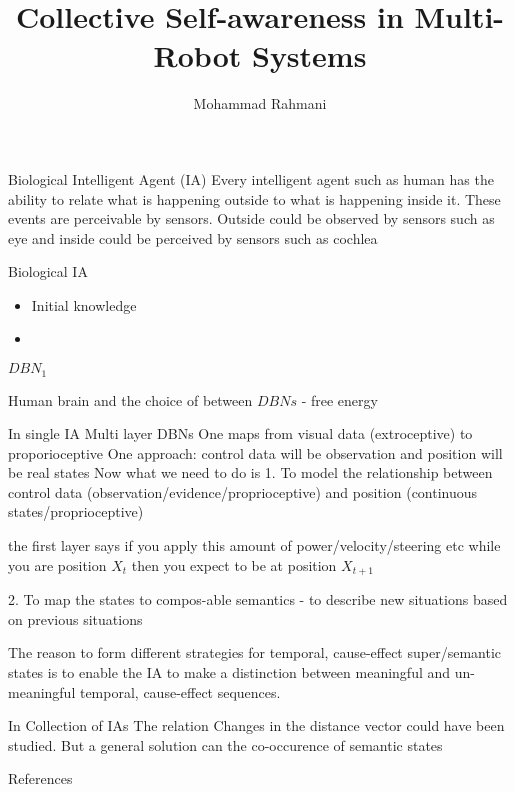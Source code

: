 \documentclass[unknownkeysallowed]{beamer}
\title{Collective Self-awareness in Multi-Robot Systems}
\author{Mohammad Rahmani}
\institute{DECIDE Doctoral School}
\begin{document}
\begin{frame}
	\maketitle
\end{frame}


\begin{frame}{Biological Intelligent Agent (IA)}
	Every intelligent agent such as human has the ability to relate what is happening outside to what is happening inside it.
	These events are perceivable by sensors. Outside could be observed by sensors such as eye and inside could be perceived by sensors such as cochlea
\end{frame}

\begin{frame}{Biological IA}
	\begin{itemize}
		\item Initial knowledge
		\item 
	\end{itemize}
$DBN_1$

Human brain and the choice of between $DBNs$ -  free energy
\end{frame}

\begin{frame}{In single IA}
Multi layer DBNs
One maps from visual data (extroceptive) to proporioceptive 
One approach: control data will be observation and position will be real states
Now what we need to do is 
1. To model the relationship between control data (observation/evidence/proprioceptive) and position (continuous states/proprioceptive)

the first layer says if you apply this amount of power/velocity/steering etc while you are position $X_t$ then you expect to be at position $X_{t+1}$ 

2. To map the states to compos-able semantics - to describe new situations based on previous situations



The reason to form different strategies for temporal, cause-effect super/semantic states is to enable the IA to make a distinction between meaningful and un-meaningful temporal, cause-effect sequences. 
\end{frame}


\begin{frame}{In Collection of IAs}
The relation
Changes in the distance vector could have been studied. But a general solution can the co-occurence of semantic states
\end{frame}

\begin{frame}[allowframebreaks]{References}
	\printbibliography
\end{frame}
\end{document}
